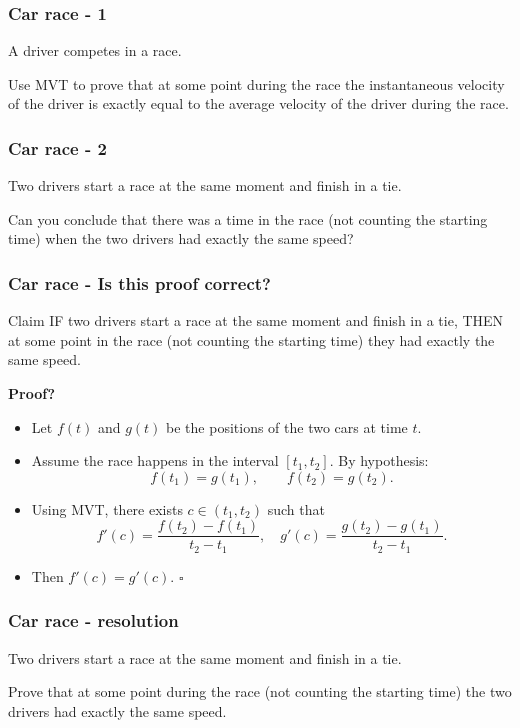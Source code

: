 \documentclass[14pt]{beamer}
\newcommand{\setsize}[1]{\fontsize{#1}{#1}\selectfont} %
\newcommand{\smallerfont}{\setsize{13}} %
\begin{document}
	\begin{frame}[t]
		\smallerfont
		\frametitle{Car race - 1}

		A driver competes in a race.

		\medskip
		Use MVT to prove that at some point during the race the instantaneous
		velocity of the driver is exactly equal to the average velocity of the
		driver during the race.
	\end{frame}
	\begin{frame}[t]
		\smallerfont
		\frametitle{Car race - 2}

		Two drivers start a race at the same moment and finish in a tie.

		\medskip
		Can you conclude that there was a time in the race (not counting the starting
		time) when the two drivers had exactly the same speed?
	\end{frame}
	\begin{frame}[t]
		\smallerfont
		\frametitle{Car race - Is this proof correct?}

		\begin{block}{\smallerfont Claim}
			IF two drivers start a race at the same moment and finish in a tie, THEN
			at some point in the race (not counting the starting time) they had
			exactly the same speed.
		\end{block}

		{\bf Proof?}
		\begin{itemize}
			\item Let $f(t)$ and $g(t)$ be the positions of the two cars at time $t$.

			\item Assume the race happens in the interval $[t_{1},t_{2}]$. By
				hypothesis:
				\[
					f(t_{1}) = g(t_{1}), \quad \quad f(t_{2}) = g(t_{2}).
				\]

			\item Using MVT, there exists $c \in (t_{1}, t_{2})$ such that
				\[
					f'(c) = \frac{f(t_{2}) - f(t_{1})}{t_{2}- t_{1}}, \quad g'(c) = \frac{g(t_{2})
					- g(t_{1})}{t_{2}- t_{1}}.
				\]

			\item Then $f'(c) = g'(c)$. \hfill $\square$
		\end{itemize}
	\end{frame}
	\begin{frame}[t]
		\smallerfont
		\frametitle{Car race - resolution}

		Two drivers start a race at the same moment and finish in a tie.

		\medskip
		Prove that at some point during the race (not counting the starting time)
		the two drivers had exactly the same speed.
	\end{frame}
\end{document}
